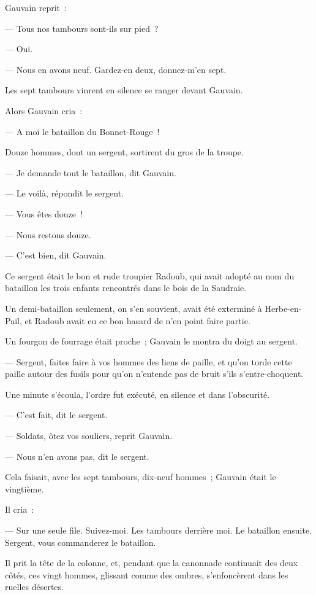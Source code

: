 \documentclass[french,twoside]{book} %
\begin{document}
Gauvain reprit :\par
— Tous nos tambours sont-ils sur pied ?\par
— Oui.\par
— Nous en avons neuf. Gardez-en deux, donnez-m’en sept.\par
Les sept tambours vinrent en silence se ranger devant Gauvain.\par
Alors Gauvain cria :\par
— A moi le bataillon du Bonnet-Rouge !\par
Douze hommes, dont un sergent, sortirent du gros de la troupe.\par
— Je demande tout le bataillon, dit Gauvain.\par
— Le voilà, répondit le sergent.\par
— Vous êtes douze !\par
— Nous restons douze.\par
— C’est bien, dit Gauvain.\par
Ce sergent était le bon et rude troupier Radoub, qui avait adopté au nom du bataillon les trois enfants rencontrés dans le bois de la Saudraie.\par
 Un demi-bataillon seulement, on s’en souvient, avait été exterminé à Herbe-en-Pail, et Radoub avait eu ce bon hasard de n’en point faire partie.\par
Un fourgon de fourrage était proche ; Gauvain le montra du doigt au sergent.\par
— Sergent, faites faire à vos hommes des liens de paille, et qu’on torde cette paille autour des fusils pour qu’on n’entende pas de bruit s’ils s’entre-choquent.\par
Une minute s’écoula, l’ordre fut exécuté, en silence et dans l’obscurité.\par
— C’est fait, dit le sergent.\par
— Soldats, ôtez vos souliers, reprit Gauvain.\par
— Nous n’en avons pas, dit le sergent.\par
Cela faisait, avec les sept tambours, dix-neuf hommes ; Gauvain était le vingtième.\par
Il cria :\par
— Sur une seule file. Suivez-moi. Les tambours derrière moi. Le bataillon ensuite. Sergent, vous commanderez le bataillon.\par
Il prit la tête de la colonne, et, pendant que la canonnade continuait des deux côtés, ces vingt hommes, glissant comme des ombres, s’enfoncèrent dans les ruelles désertes.\par
\end{document}
